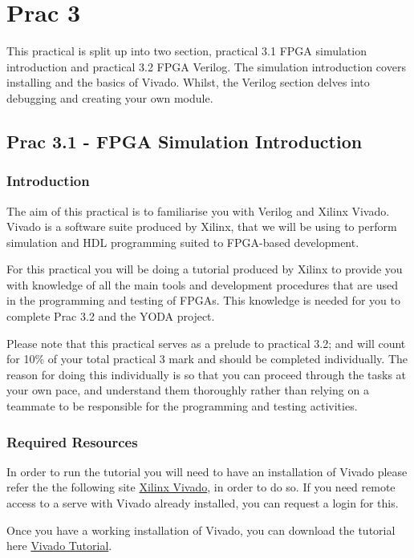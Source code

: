
\section{Prac 3}
This practical is split up into two section, practical 3.1 FPGA simulation introduction and practical 3.2 FPGA Verilog. The simulation introduction covers installing and the basics of Vivado. Whilst, the Verilog section delves into debugging and creating your own module.
\label{sec:Prac3}

\subsection{Prac 3.1 - FPGA Simulation Introduction}
\subsubsection{Introduction}
The aim of this practical is to familiarise you with Verilog and Xilinx Vivado. Vivado is a software suite produced by Xilinx, that we will be using to perform simulation and HDL programming suited to FPGA-based development.

For this practical you will be doing a tutorial produced by Xilinx to provide you with knowledge of all the main tools and development procedures that are used in the programming and testing of FPGAs. This knowledge is needed for you to complete Prac 3.2 and the YODA project.

Please note that this practical serves as a prelude to practical 3.2; and will count for 10\% of your total practical 3 mark and should be completed individually. The reason for doing this individually is so that you can proceed through the tasks at your own pace, and understand them thoroughly rather than relying on a teammate to be responsible for the programming and testing activities.

\subsubsection{Required Resources}

In order to run the tutorial you will need to have an installation of Vivado please refer the the following site \href{http://wiki.ee.uct.ac.za/Xilinx_Vivado}{Xilinx Vivado}, in order to do so. If you need remote access to a serve with Vivado already installed, you can request a login for this.

Once you have a working installation of Vivado, you can download the tutorial here \href{https://www.xilinx.com/support/documentation/sw_manuals/xilinx2020_1/ug937-vivado-design-suite-simulation-tutorial.pdf}{Vivado Tutorial}.

